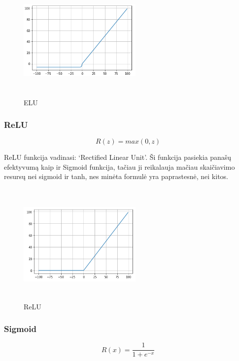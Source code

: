 \documentclass{VUMIFInfKursinis}
\begin{document}
\begin{figure}[ht]
  \includegraphics[width=6cm,height=6cm,keepaspectratio]{elu.png}
  \caption{ELU}
  \label{fig:elu}
\end{figure}

\subsubsection{ReLU}
\[
  R(z) = max(0, z)
\]

\par
ReLU funkcija vadinasi: ‘Rectified Linear Unit’. Ši funkcija pasiekia panašų efektyvumą
kaip ir Sigmoid funkcija, tačiau ji reikalauja mačiau skaičiavimo resursų nei sigmoid
ir tanh, nes minėta formulė yra paprastesnė, nei kitos. \cite{salt16}

\begin{figure}[ht]
  \includegraphics[width=6cm,height=6cm,keepaspectratio]{relu.png}
  \caption{ReLU}
  \label{fig:relu}
\end{figure}

\subsubsection{Sigmoid}
\[
  R(x) = \frac{1}{1 + e^{-x}}
\]
\end{document}
